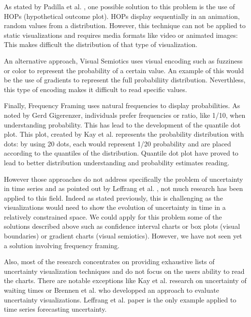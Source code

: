 \documentclass[a4paper,3p,sort&compress]{elsarticle}
\begin{document}
As stated by Padilla et al. \cite{padilla_uncertainty_2021}, one possible solution to this problem is the use of HOPs 
(hypothetical outcome plot). HOPs display 
sequentially in an animation, random values from a distribution. However, this technique can not be 
applied to static visualizations and requires media formats like video or animated images: This makes difficult the distribution 
of that type of visualization.

An alternative approach, Visual Semiotics uses visual encoding such as fuzziness or color to represent 
the probability of a certain value. An example of this would be the use of gradients to represent the 
full probabiliity distribution. Neverthless, this type of encoding makes it difficult to read specific 
values. 

Finally, Frequency Framing uses natural frequencies to display probabilities. As noted by Gerd 
Gigerenzer, individuals prefer frequencies or ratio, like 1/10, when understanding probability. This has 
lead to the development of the quantile dot plot. This plot, created by Kay et al. 
\cite{2016-when-ish-is-my-bus} 
represents 
the probability distribution with dots: by using 20 dots, each would represent 1/20 probability 
and are placed according 
to the quantiles of the distribution. Quantile dot plot have proved to lead to better distribution 
understanding and probability estimates reading. 

However those approaches do not address specifically the problem of uncertainty in time series 
and as pointed out by Leffrang et al. \cite{leffrang_should_2021}, not much research has been applied to this 
field. Indeed as stated previously, this is challenging as the visualizations would need to show the evolution 
of uncertainty in time in a relatively constrained space. We could apply for this problem some of the solutions 
described above such as confidence interval charts or 
box plots (visual boundaries) or gradient charts (visual semiotics). However, we have not seen yet a solution involving 
frequency framing. 

Also, most of the research concentrates on providing exhaustive lists of uncertainty visualization techniques and do not 
focus on the users ability to read the charts. There are notable exceptions like Kay et al. \cite{2016-when-ish-is-my-bus}
research on uncertainty of waiting times or Brennen et al. \cite{brennen_instrument_2018} who developped an 
approach to evaluate uncertainty visualizations.
Leffrang et al. \cite{leffrang_should_2021} paper is the only example applied to time series forecasting uncertainty.
\end{document}

